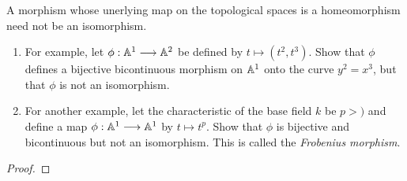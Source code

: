 \label{1.3.2}

A morphism whose unerlying map on the topological spaces is a homeomorphism need not be an isomorphism.

\begin{enumerate}[label = (\alph*)]
    \item For example, let $\phi: \mathbb A^1 \longrightarrow \mathbb A^2$ be defined by $t \mapsto (t^2, t^3)$. Show that $\phi$ defines a bijective bicontinuous morphism on $\mathbb A^1$ onto the curve $y^2 = x^3$, but that $\phi$ is not an isomorphism.

    \item For another example, let the characteristic of the base field $k$ be $p > )$ and define a map $\phi: \mathbb A^1 \longrightarrow \mathbb A^1$ by $t \mapsto t^p$. Show that $\phi$ is bijective and bicontinuous but not an isomorphism. This is called the \emph{Frobenius morphism}.
\end{enumerate}

\begin{proof}

\end{proof}

